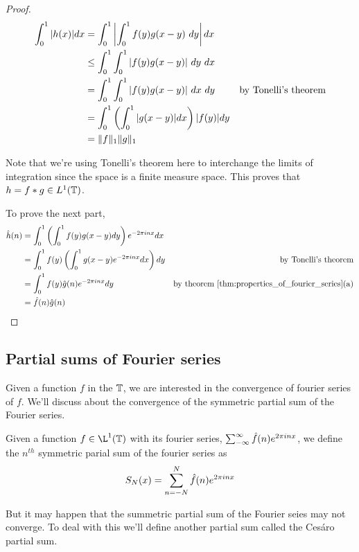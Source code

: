   \begin{proof}
    \begin{align*}
  \int_{0}^{1} |h(x)| dx &= \int_{0}^{1} \left| \int_{0}^{1} f(y)g(x-y)\  dy \right| dx \\
                         &\le \int_{0}^{1} \int_{0}^{1} |f(y)g(x-y)| \ dy \ dx \\
                         &= \int_{0}^{1} \int_{0}^{1} |f(y)g(x-y)| \ dx \ dy & \text{by Tonelli's theorem}\\
                         &= \int_{0}^{1} \left( \int_{0}^{1} |g(x-y)| dx \right) |f(y)|dy \\
                         &=\norm{f}_1 \norm{g}_1
    \end{align*}

    Note that we're using Tonelli's theorem here to interchange the limits of integration since the space is a finite measure space. This proves that $h = f*g \in L^1(\mathbb T)$.

    To prove the next part,
    \begin{align*}
      \hat{h}(n) &= \int_0^1 \left( \int_0^1 f(y)g(x-y)dy \right) e^{-2\pi in x} dx \\
               &= \int_0^1 f(y) \left( \int_0^1 g(x-y) e^{-2\pi in x}dx \right) dy & \text{by Tonelli's theorem}\\  
               &= \int_0^1 f(y) \hat{g}(n)e^{-2\pi inx} dy & \text{by theorem } \ref{thm:properties_of_fourier_series} \text{(a)}\\
               &= \hat{f}(n)\hat{g}(n)
    \end{align*}
  \end{proof}
 

  \subsection{Partial sums of Fourier series}
  Given a function $f$ in the $\mathbb T$, we are interested in the convergence of fourier series of $f$. We'll discuss about the convergence of the symmetric partial sum of the Fourier series.

  \begin{definition}
    \label{def:symmetric_partial_sum_of_fourier_series}
    Given a function $f \in \L^1(\T)$ with its fourier series, $\sum_{-\infty}^\infty \hat{f}(n)e^{2\pi in x}$, we define the $n^{th}$ symmetric parial sum of the fourier series as
    \begin{displaymath}
      S_N(x) = \sum_{n=-N}^N \hat{f}(n)e^{2\pi inx}
    \end{displaymath}
  \end{definition}
  But it may happen that the summetric partial sum of the Fourier seies may not converge. To deal with this we'll define another partial sum called the Ces\'aro partial sum.

